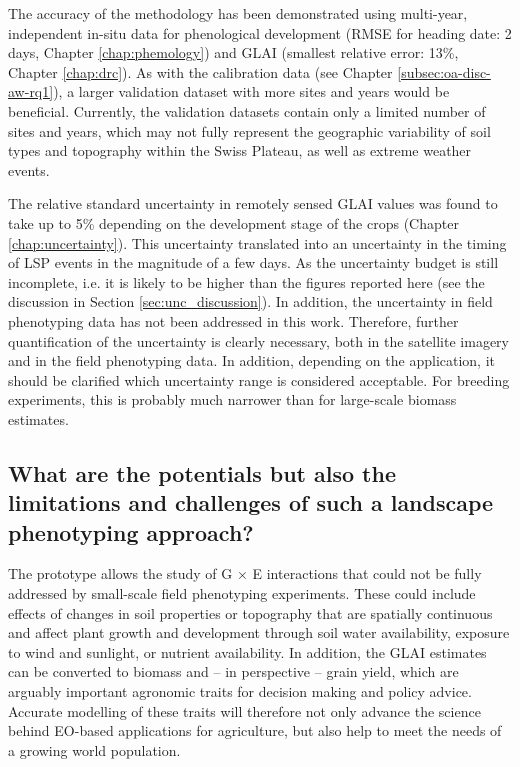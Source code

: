The accuracy of the methodology has been demonstrated using multi-year, independent in-situ data for phenological development (RMSE for heading date: 2 days, Chapter \ref{chap:phemology}) and GLAI (smallest relative error: 13\%, Chapter \ref{chap:drc}). As with the calibration data (see Chapter \ref{subsec:oa-disc-aw-rq1}), a larger validation dataset with more sites and years would be beneficial. Currently, the validation datasets contain only a limited number of sites and years, which may not fully represent the geographic variability of soil types and topography within the Swiss Plateau, as well as extreme weather events.

The relative standard uncertainty in remotely sensed \gls{GLAI} values was found to take up to 5\% depending on the development stage of the crops (Chapter \ref{chap:uncertainty}). This uncertainty translated into an uncertainty in the timing of \gls{LSP} events in the magnitude of a few days. As the uncertainty budget is still incomplete, i.e. it is likely to be higher than the figures reported here (see the discussion in Section \ref{sec:unc_discussion}). In addition, the uncertainty in field phenotyping data has not been addressed in this work. Therefore, further quantification of the uncertainty is clearly necessary, both in the satellite imagery and in the field phenotyping data. In addition, depending on the application, it should be clarified which uncertainty range is considered acceptable. For breeding experiments, this is probably much narrower than for large-scale biomass estimates.

\subsection{What are the potentials but also the limitations and challenges of such a landscape phenotyping approach?}

The prototype allows the study of G $\times$ E interactions that could not be fully addressed by small-scale field phenotyping experiments. These could include effects of changes in soil properties or topography that are spatially continuous and affect plant growth and development through soil water availability, exposure to wind and sunlight, or nutrient availability. In addition, the \gls{GLAI} estimates can be converted to biomass \citep{aase_relationship_1978} and -- in perspective -- grain yield, which are arguably important agronomic traits for decision making and policy advice. Accurate modelling of these traits will therefore not only advance the science behind \gls{EO}-based applications for agriculture, but also help to meet the needs of a growing world population.

